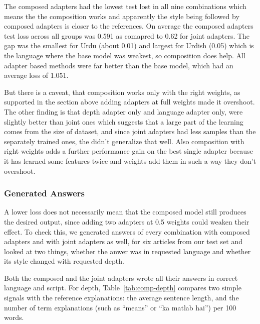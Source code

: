 \documentclass{FastFyp}
\begin{document}
The composed adapters had the lowest test lost in all nine combinations which means the the composition works and apparently the style being followed by composed adapters is closer to the references. On average the composed adapters test loss across all groups was 0.591 as comapred to 0.62 for joint adapters. The gap was the smallest for Urdu (about 0.01) and largest for Urdish (0.05) which is the language where the base model was weakest, so composition does help. All adapter based methods were far better than the base model, which had an average loss of 1.051.

But there is a caveat, that composition works only with the right weights, as supported in the section above adding adapters at full weights made it overshoot. The other finding is that depth adapter only and language adapter only, were slightly better than joint ones which suggests that a large part of the learning comes from the size of dataset, and since joint adapters had less samples than the separately trained ones, the didn't generalize that well. Also composition with right weights adds a further performance gain on the best single adapter because it has learned some features twice and weights add them in such a way they don't overshoot.

\subsubsection{Generated Answers}
 A lower loss does not necessarily mean that the composed model still produces the desired output, since adding two adapters at 0.5 weights could weaken their effect. To check this, we generated answers of every combination with composed adapters and with joint adapters as well, for six articles from our test set and looked at two things, whether the anwer was in requested language and whether its style changed with requested depth.

Both the composed and the joint adapters wrote all their answers in correct language and script. For depth, Table~\ref{tab:comp-depth} compares two simple signals with the reference explanations: the average sentence length, and the number of term explanations (such as ``means'' or ``ka matlab hai'') per 100 words.
\end{document}
